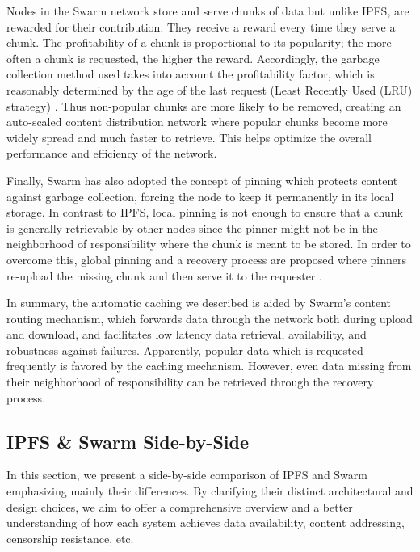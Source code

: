 Nodes in the Swarm network store and serve chunks of data but unlike IPFS, are rewarded for their contribution. They receive a reward every time they serve a chunk. The profitability of a chunk is proportional to its popularity; the more often a chunk is requested, the higher the reward. Accordingly, the garbage collection method used takes into account the profitability factor, which is reasonably determined by the age of the last request (Least Recently Used (LRU) strategy) \citep[p.~72]{tron_2020}. Thus non-popular chunks are more likely to be removed, creating an auto-scaled content distribution network \citep[p.~72]{tron_2020} where popular chunks become more widely spread and much faster to retrieve. This helps optimize the overall performance and efficiency of the network.

Finally, Swarm has also adopted the concept of pinning which protects content against garbage collection, forcing the node to keep it permanently in its local storage. In contrast to IPFS, local pinning is not enough to ensure that a chunk is generally retrievable by other nodes since the pinner might not be in the neighborhood of responsibility where the chunk is meant to be stored. In order to overcome this, global pinning and a recovery process are proposed where pinners re-upload the missing chunk and then serve it to the requester \citep[pp.~161--167]{tron_2020}.

In summary, the automatic caching we described is aided by Swarm's content routing mechanism, which forwards data through the network both during upload and download, and facilitates low latency data retrieval, availability, and robustness against failures. Apparently, popular data which is requested frequently is favored by the caching mechanism. However, even data missing from their neighborhood of responsibility can be retrieved through the recovery process.

\subsection{IPFS \& Swarm Side-by-Side}\label{sec:ipfs_vs_swarm}
In this section, we present a side-by-side comparison of IPFS and Swarm emphasizing mainly their differences. By clarifying their distinct architectural and design choices, we aim to offer a comprehensive overview and a better understanding of how each system achieves data availability, content addressing, censorship resistance, etc.

